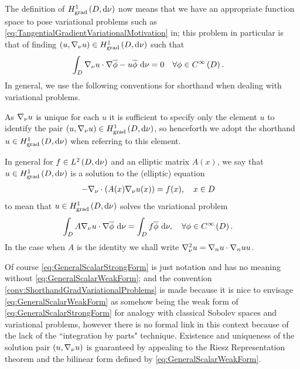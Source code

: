 The definition of $H^1_\mathrm{grad}\left( D, \mathrm{d}\nu \right)$ now means that we have an appropriate function space to pose variational problems such as \eqref{eq:TangentialGradientVariationalMotivation} in; this problem in particular is that of finding $\left( u,\nabla_\nu u \right)\in H^1_\mathrm{grad}\left( D, \mathrm{d}\nu \right)$ such that
\begin{align} \label{eq:GeneralVariationProblem}
	\int_{D}\nabla_\nu u \cdot \nabla\overline{\phi} - u\overline{\phi} \ \mathrm{d}\nu &= 0 \quad \forall\phi\in C^{\infty}\left( D \right).
\end{align}
In general, we use the following conventions for shorthand when dealing with variational problems.
\begin{convention} \label{conv:ShorthandSobSpaceElements}
	As $\nabla_\nu u$ is unique for each $u$ it is sufficient to specify only the element $u$ to identify the pair $\left( u,\nabla_\nu u \right)\in H^1_\mathrm{grad}\left( D, \mathrm{d}\nu \right)$, so henceforth we adopt the shorthand $u\in H^1_\mathrm{grad}\left( D, \mathrm{d}\nu \right)$ when referring to this element.
\end{convention}
\begin{convention} \label{conv:ShorthandGradVariationalProblems}
	In general for $f\in L^{2}\left( D,\mathrm{d}\nu \right)$ and an elliptic matrix $A(x)$, we say that $u\in H^1_\mathrm{grad}\left( D, \mathrm{d}\nu \right)$ is a solution to the (elliptic) equation
	\begin{align} \label{eq:GeneralScalarStrongForm}
		-\nabla_\nu \cdot \left( A(x)\nabla_\nu u(x) \right) &= f(x), \quad x\in D
	\end{align}
	to mean that $u\in H^1_\mathrm{grad}\left( D, \mathrm{d}\nu \right)$ solves the variational problem
	\begin{align} \label{eq:GeneralScalarWeakForm}
		\int_{D}A\nabla_\nu u \cdot \nabla\overline{\phi} \ \mathrm{d}\nu &= \int_{D}f\overline{\phi} \ \mathrm{d}\nu, \quad \forall \phi\in C^{\infty}\left( D \right).
	\end{align}
	In the case when $A$ is the identity we shall write $\nabla_\nu^2 u = \nabla_nu\cdot\nabla_nu u$.
\end{convention}
Of course \eqref{eq:GeneralScalarStrongForm} is just notation and has no meaning without \eqref{eq:GeneralScalarWeakForm}; and the convention \ref{conv:ShorthandGradVariationalProblems} is made because it is nice to envisage \eqref{eq:GeneralScalarWeakForm} as somehow being the weak form of \eqref{eq:GeneralScalarStrongForm} for analogy with classical Sobolev spaces and variational problems, however there is no formal link in this context because of the lack of the ``integration by parts" technique.
Existence and uniqueness of the solution pair $\left( u,\nabla_\nu u \right)$ is guaranteed by appealing to the Riesz Representation theorem and the bilinear form defined by \eqref{eq:GeneralScalarWeakForm}.
